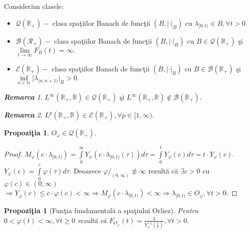 \documentclass[ a4paper, 12pt]{report}
\newtheorem{prop}[theorem]{\bf Propozi\c tia }
\theoremstyle{definition}
\theoremstyle{remark}
\newtheorem{remarc}{\bf Remarca}[section]
\numberwithin{equation}{section}
\begin{document}
Consider\u am clasele:\\
\begin{itemize}
\item $\mathcal{Q}(\mathbb{R}_+)-$ clasa spa\c tiilor Banach de func\c tii $(B, \lvert \cdot \rvert_B)$ cu  $\lambda_{[0,t)} \in B, \forall t>0$.
\item $\mathcal{B}(\mathcal{R}_+)-$ clasa spa\c tiilor Banach de func\c tii $(B,\lvert \cdot \rvert_B)$ cu $B \in \mathcal{Q}(\mathbb{R_+})$ \c si $\lim\limits_{t \rightarrow \infty} F_B(t) = \infty.$
\item $\mathcal{E}(\mathbb{R}_+)-$ clasa spa\c tiilor Banach de func\c tii $(B, \lvert \cdot \rvert_B)$ cu $B \in \mathcal{B}(\mathbb{R}_+)$ \c si $\inf\limits_{n \in \mathbb
N} \lvert \lambda_ {[n,n+1)}\rvert_B > 0.$
\end{itemize}
\begin{remarc}
$L^\infty(\mathbb{R}_+,\mathbb{R}) \in \mathcal{Q}(\mathbb{R}_+)$ \c si $L^\infty(\mathbb{R}_+,\mathbb{R}) \notin \mathcal{B}(\mathbb{R}_+).$
\end{remarc}
\begin{remarc}
$L^p(\mathbb{R}_+,\mathbb{R}) \in \mathcal{E}(\mathbb{R}_+), \forall p \in [1,\infty).$
\end{remarc}
\begin{prop}
$O_\varphi \in \mathcal{Q}(\mathbb{R}_+).$
\end{prop}
\begin{proof}
$M_\varphi(c \cdot \lambda_{[0,t)}) = \int\limits_{0}^{\infty}Y_\varphi(c \cdot \lambda_{[0,t)}(\tau)) d\tau = \int\limits_{0}^{t} Y_\varphi(c) d\tau = t \cdot Y_\varphi (c).$\\
$Y_\varphi(c) = \int\limits_{0}^{c}\varphi(\tau)d \tau$. Deoarece $\varphi/_{(0,\infty)} \not\equiv \infty$ rezult\u a c\u a $\exists c>0$ cu $\varphi(c) \in (0,\infty)$
$ \Rightarrow Y_\varphi(c) \leq c \cdot \varphi(c) < \infty \Rightarrow M_\varphi(c \cdot \lambda_{[0,t)}) < \infty \Rightarrow \lambda_{[0,t)} \in O_\varphi, \forall t>0.$
\end{proof}
\begin{prop}[Fun\c tia fundamental\u a a spa\c tiului Orliez]
Pentru \\$0 < \varphi(t) < \infty, \forall t \geq 0$ rezult\u a c\u a  $F_{O_\varphi}(t) = \frac{1}{Y_\varphi^{-1}(\frac{1}{t})}, \forall t>0.$
\end{prop}
\end{document}
